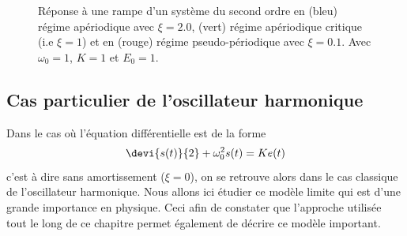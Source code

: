 \begin{figure}[!t]
\begin{center}
    \caption{Réponse à une rampe d'un système du second ordre en 
	        (bleu) régime apériodique avec $\xi=2.0$, 
			(vert) régime apériodique critique (i.e $\xi=1$) et en 
			(rouge) régime pseudo-périodique avec $\xi=0.1$. 
			Avec $\omega_0=1$, $K=1$ et $E_0=1$. \label{fig-2nd_ramp}}
\end{center}
\end{figure}



\subsection{Cas particulier de l'oscillateur harmonique}



Dans le cas où l'équation différentielle est de la forme 
$$
\devi{s(t)}{2}+\omega_0^2 s(t)=Ke(t)
$$
c'est à dire sans amortissement ($\xi=0$), on se retrouve alors dans le 
cas classique de l'oscillateur harmonique.
Nous allons ici étudier ce modèle limite qui est d'une grande importance 
en physique. Ceci afin de constater que l'approche utilisée tout le long de 
ce chapitre permet également de décrire ce modèle important. 

